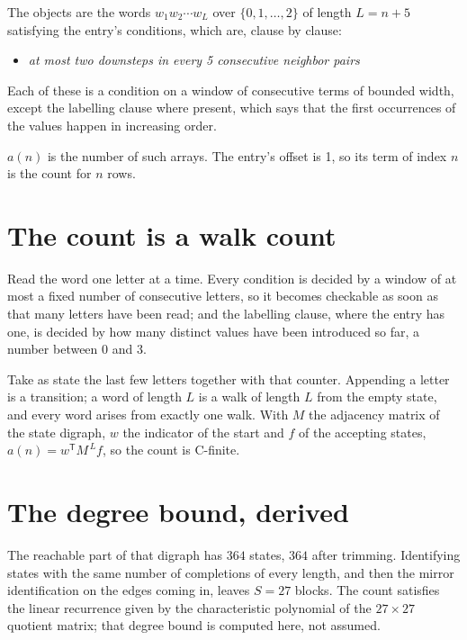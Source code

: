 \documentclass[11pt]{article}
\theoremstyle{definition}
\begin{document}
The objects are the words $w_1 w_2 \cdots w_L$ over $\{0,1,\dots,2\}$ of length $L = n + 5$ satisfying the entry's conditions, which are, clause by clause:

\begin{itemize}

\item {\itshape at most two downsteps in every 5 consecutive neighbor pairs}

\end{itemize}

Each of these is a condition on a window of consecutive terms of bounded width, except the labelling clause where present, which says that the first occurrences of the values happen in increasing order.

$a(n)$ is the number of such arrays. The entry's offset is 1, so its term of index $n$ is the count for $n$ rows.

\section{The count is a walk count}

Read the word one letter at a time. Every condition is decided by a window of at most a fixed number of consecutive letters, so it becomes checkable as soon as that many letters have been read; and the labelling clause, where the entry has one, is decided by how many distinct values have been introduced so far, a number between $0$ and 3.

Take as state the last few letters together with that counter. Appending a letter is a transition; a word of length $L$ is a walk of length $L$ from the empty state, and every word arises from exactly one walk. With $M$ the adjacency matrix of the state digraph, $w$ the indicator of the start and $f$ of the accepting states, $a(n) = w^{\mathsf T}M^{\,L}f$, so the count is C-finite.

\section{The degree bound, derived}

The reachable part of that digraph has $364$ states, $364$ after trimming. Identifying states with the same number of completions of every length, and then the mirror identification on the edges coming in, leaves $S = 27$ blocks. The count satisfies the linear recurrence given by the characteristic polynomial of the $27\times27$ quotient matrix; that degree bound is computed here, not assumed.
\end{document}
